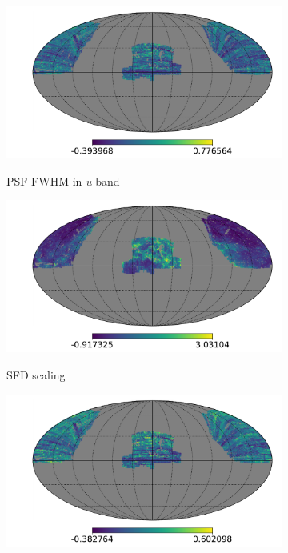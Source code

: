\begin{figure}
\begin{subfigure}{.33\textwidth}
  \centering
    \includegraphics[scale=0.214]{SystematicMaps2/map_sdss_dr12_systematics_psffwhmu.pdf}
	\label{fig:systmap0}
    \caption{PSF FWHM in \textit{u} band}
\end{subfigure}
\begin{subfigure}{.33\textwidth}
  \centering
	\centering
    \includegraphics[scale=0.214]{SystematicMaps2/map_extinction_sfd-scaling_Overdensity_N512_cmassAll.pdf}
	\label{fig:systmap1}
    \caption{SFD scaling}
\end{subfigure}
\begin{subfigure}{.33\textwidth}
  \centering
	\centering
    \includegraphics[scale=0.214]{SystematicMaps2/map_sdss_dr12_systematics_psffwhmr.pdf}

\end{subfigure}
\end{figure}
